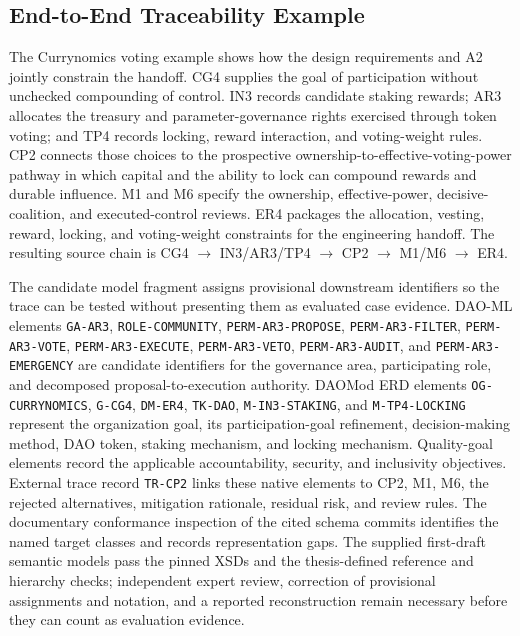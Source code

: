 \documentclass[referee,sn-basic]{sn-jnl}
\begin{document}
\subsection{End-to-End Traceability Example}\label{subsec:traceability-example}

The Currynomics voting example shows how the design requirements and A2 jointly
constrain the handoff. CG4 supplies the goal of participation without unchecked
compounding of control. IN3 records candidate staking rewards; AR3 allocates the
treasury and parameter-governance rights exercised through token voting; and TP4 records locking, reward interaction, and
voting-weight rules. CP2 connects those choices to the prospective
ownership-to-effective-voting-power pathway in which capital and the ability to
lock can compound rewards and durable influence. M1 and M6 specify the ownership,
effective-power, decisive-coalition, and executed-control reviews. ER4 packages
the allocation, vesting, reward, locking, and voting-weight constraints for the
engineering handoff. The resulting source chain is
CG4 $\rightarrow$ IN3/AR3/TP4 $\rightarrow$ CP2 $\rightarrow$ M1/M6
$\rightarrow$ ER4.

The candidate model fragment assigns provisional downstream identifiers so the
trace can be tested without presenting them as evaluated case evidence.
DAO-ML elements \texttt{GA-AR3}, \texttt{ROLE-COMMUNITY},
\texttt{PERM-AR3-PROPOSE}, \texttt{PERM-AR3-FILTER},
\texttt{PERM-AR3-VOTE}, \texttt{PERM-AR3-EXECUTE},
\texttt{PERM-AR3-VETO}, \texttt{PERM-AR3-AUDIT}, and
\texttt{PERM-AR3-EMERGENCY} are candidate identifiers for the governance area,
participating role, and decomposed proposal-to-execution authority. DAOMod ERD elements
\texttt{OG-CURRYNOMICS}, \texttt{G-CG4}, \texttt{DM-ER4}, \texttt{TK-DAO},
\texttt{M-IN3-STAKING}, and \texttt{M-TP4-LOCKING} represent the organization
goal, its participation-goal refinement, decision-making method, DAO token, staking mechanism, and locking
mechanism. Quality-goal elements record the applicable accountability,
security, and inclusivity objectives. External trace record \texttt{TR-CP2}
links these native elements to CP2, M1, M6, the rejected alternatives,
mitigation rationale, residual risk, and review rules. The documentary
conformance inspection of the cited schema commits identifies the named target classes and records
representation gaps. The supplied first-draft semantic models pass the pinned
XSDs and the thesis-defined reference and hierarchy checks; independent expert
review, correction of provisional assignments and notation, and a reported
reconstruction remain necessary before they can count as evaluation evidence.
\end{document}
